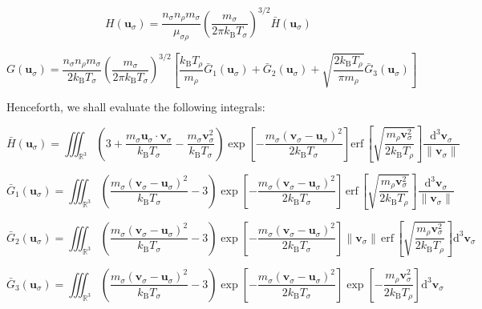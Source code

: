 \begin{equation}
    H(\mathbf{u}_\sigma)=\frac{n_\sigma n_\rho m_\sigma}{\mu_{\sigma\rho}}\left(\frac{m_\sigma}{2\pi k_\mathrm{B}T_\sigma}\right)^{3/2}\bar{H}(\mathbf{u}_\sigma)
\end{equation}

\begin{equation}
    G(\mathbf{u}_\sigma)=\frac{n_\sigma n_\rho m_\sigma}{2k_\mathrm{B}T_\sigma}\left(\frac{m_\sigma}{2\pi k_\mathrm{B}T_\sigma}\right)^{3/2}\left[\frac{k_\mathrm{B}T_\rho}{m_\rho}\bar{G}_1(\mathbf{u}_\sigma)+\bar{G}_2(\mathbf{u}_\sigma)+\sqrt{\frac{2k_\mathrm{B}T_\rho}{\pi m_\rho}}\bar{G}_3(\mathbf{u}_\sigma)\right]
\end{equation}

Henceforth, we shall evaluate the following integrals:

\begin{equation}
    \bar{H}(\mathbf{u}_\sigma)=\iiint_{\mathbb{R}^3}\left(3+\frac{m_\sigma\mathbf{u}_\sigma\cdot\mathbf{v}_\sigma}{k_\mathrm{B}T_\sigma}-\frac{m_\sigma\mathbf{v}_\sigma^2}{k_\mathrm{B}T_\sigma}\right)\exp{\left[-\frac{m_\sigma(\mathbf{v}_\sigma-\mathbf{u}_\sigma)^2}{2k_\mathrm{B}T_\sigma}\right]}\text{erf}\,\left[\sqrt{\frac{m_\rho\mathbf{v}_\sigma^2}{2k_\mathrm{B}T_\rho}}\right]\frac{\mathrm{d}^3\mathbf{v}_\sigma}{\|\mathbf{v}_\sigma\|}
\end{equation}

\begin{equation}
    \bar{G}_1(\mathbf{u}_\sigma)=\iiint_{\mathbb{R}^3}\left(\frac{m_\sigma(\mathbf{v}_\sigma-\mathbf{u}_\sigma)^2}{k_\mathrm{B}T_\sigma}-3\right)\exp{\left[-\frac{m_\sigma(\mathbf{v}_\sigma-\mathbf{u}_\sigma)^2}{2k_\mathrm{B}T_\sigma}\right]}\,\text{erf}\,\left[\sqrt{\frac{m_\rho\mathbf{v}_\sigma^2}{2k_\mathrm{B}T_\rho}}\right]\frac{\mathrm{d}^3\mathbf{v}_\sigma}{\|\mathbf{v}_\sigma\|}
\end{equation}

\begin{equation}
    \bar{G}_2(\mathbf{u}_\sigma)=\iiint_{\mathbb{R}^3}\left(\frac{m_\sigma(\mathbf{v}_\sigma-\mathbf{u}_\sigma)^2}{k_\mathrm{B}T_\sigma}-3\right)\exp{\left[-\frac{m_\sigma(\mathbf{v}_\sigma-\mathbf{u}_\sigma)^2}{2k_\mathrm{B}T_\sigma}\right]}\|\mathbf{v}_\sigma\|\,\text{erf}\,\left[\sqrt{\frac{m_\rho\mathbf{v}_\sigma^2}{2k_\mathrm{B}T_\rho}}\right]\mathrm{d}^3\mathbf{v}_\sigma
\end{equation}

\begin{equation}
    \bar{G}_3(\mathbf{u}_\sigma)=\iiint_{\mathbb{R}^3}\left(\frac{m_\sigma(\mathbf{v}_\sigma-\mathbf{u}_\sigma)^2}{k_\mathrm{B}T_\sigma}-3\right)\exp{\left[-\frac{m_\sigma(\mathbf{v}_\sigma-\mathbf{u}_\sigma)^2}{2k_\mathrm{B}T_\sigma}\right]}\exp{\left[-\frac{m_\rho\mathbf{v}_\sigma^2}{2k_\mathrm{B}T_\rho}\right]}\mathrm{d}^3\mathbf{v}_\sigma
\end{equation}

